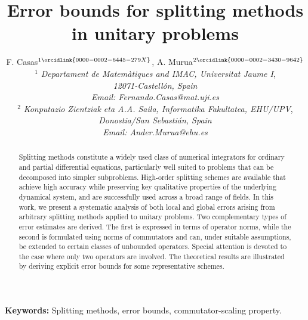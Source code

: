 \documentclass[11pt]{article}
\begin{document}
\title{Error bounds for splitting methods in unitary problems}

\author{F. Casas$^{1 \orcidlink{0000-0002-6445-279X}}$, A. Murua$^{2 \orcidlink{0000-0002-3430-9642}}$ 
  \\[2ex]
$^{1}$ {\small\it Departament de Matem\`atiques and IMAC, Universitat Jaume I}, \\{\small\it 12071-Castell\'on, Spain}\\{
\small\it Email: Fernando.Casas@mat.uji.es}\\[1ex]
$^{2}$ {\small\it Konputazio Zientziak eta A.A. Saila, Informatika Fakultatea, EHU/UPV}, \\
 {\small\it Donostia/San Sebasti\'an, Spain}\\{
\small\it Email: Ander.Murua@ehu.es}\\[1ex]
}

\maketitle

\begin{abstract}

Splitting methods constitute a widely used class of numerical integrators for ordinary and partial differential equations, particularly well suited to problems that can be decomposed into simpler subproblems. High-order splitting schemes are available that achieve high accuracy while preserving key qualitative properties of the underlying dynamical system, and are successfully used across a broad range of fields. In this work, we present a systematic analysis of both local and global errors arising from arbitrary splitting methods applied to unitary problems. Two complementary types of error estimates are derived. The first is expressed in terms of operator norms, while the second is formulated using norms of commutators and can, under suitable assumptions, be extended to certain classes of unbounded operators. Special attention is devoted to the case where only two operators are involved. The theoretical results are illustrated by deriving explicit error bounds for some representative schemes.



\end{abstract}

\bigskip

\textbf{Keywords:} Splitting methods, error bounds, commutator-scaling property.
\end{document}
